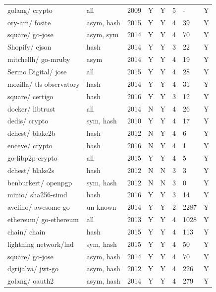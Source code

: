 \documentclass[
  digital, %
  notable,   %
  lof,     %
  lot,     %
]{fithesis3}
\begin{document}
\begin{center}
\begin{longtable}[th]{|P{1.6cm}P{1cm}P{1cm}P{1cm}P{1.3cm}P{1.3cm}P{1.2cm}P{1.1cm}|}
golang/ crypto & all & 2009 & Y & Y & 5 & - & Y\\ 
ory-am/ fosite & asym, hash & 2015 & Y & Y & 4 & 39 & Y \\
square/ go-jose & asym, sym & 2014 & Y & Y & 4 & 70 & Y \\
Shopify/ ejson & hash & 2014 & Y & Y & 3 & 22 & Y \\
mitchellh/ go-mruby & asym & 2014 & Y & Y & 4 & 19 & Y \\
Sermo Digital/ jose & all & 2015 & Y & Y & 4 & 28 & Y \\
mozilla/ tls-observatory & hash & 2014 & Y & Y & 4 & 31 & Y \\
square/ certigo & hash & 2016 & Y & Y & 3 & 12 & Y \\
docker/ libtrust & all & 2014 & N & Y & 4 & 26 & Y \\
dedis/ crypto & sym, hash & 2010 & Y & Y & 4 & 17 & Y \\
dchest/ blake2b & hash & 2012 & N & Y & 4 & 6 & Y \\
enceve/ crypto & hash & 2016 & N & Y & 4 & 1 & Y \\
go-libp2p-crypto & all & 2015 & Y & Y & 4 & 5 & Y \\ 
dchest/ blake2s & hash & 2012 & N & N & 3 & 3 & Y \\
benburkert/ openpgp & sym, hash & 2012 & N & N & 3 & 0 & Y \\
minio/ sha256-simd & hash & 2016 & Y & Y & 3 & 14 & Y \\
avelino/ awesome-go & un-known & 2014 & Y & Y & 2 & 2287 & Y \\
ethereum/ go-ethereum & all & 2013 & Y & Y & 4 & 1028 & Y \\
chain/ chain & hash & 2015 & Y & Y & 4 & 113 & Y \\
lightning network/lnd & sym, hash & 2015 & Y & Y & 4 & 50 & Y \\
square/ go-jose & asym, hash & 2014 & Y & Y & 4 & 70 & Y \\
dgrijalva/ jwt-go & asym, hash & 2012 & Y & Y & 4 & 226 & Y \\
golang/ oauth2 & asym, hash & 2014 & Y & Y & 4 & 279 & Y  
\end{longtable}
\end{center}
\end{document}
